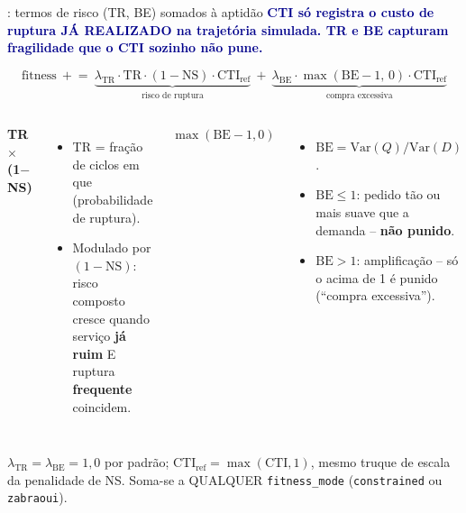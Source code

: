 \begin{frame}{\novo: termos de risco (TR, BE) somados à aptidão}
  \footnotesize
  \textbf{\textcolor{darkblue}{CTI só registra o custo de ruptura JÁ REALIZADO na trajetória simulada. TR e BE capturam fragilidade que o CTI sozinho não pune.}}
  \vspace{0.4em}

  \[
    \mathrm{fitness}\ \mathrel{+}=\ \underbrace{\lambda_{\mathrm{TR}}\cdot \mathrm{TR}\cdot(1-\mathrm{NS})\cdot \mathrm{CTI}_{\mathrm{ref}}}_{\text{risco de ruptura}}
    \ +\ \underbrace{\lambda_{\mathrm{BE}}\cdot \max(\mathrm{BE}-1,\,0)\cdot \mathrm{CTI}_{\mathrm{ref}}}_{\text{compra excessiva}}
  \]

  \begin{columns}[T,onlytextwidth]
      \textbf{TR $\times$ (1$-$NS)}
      \begin{itemize}
        \item TR = fração de ciclos em que  (probabilidade de ruptura).
        \item Modulado por $(1{-}\mathrm{NS})$: risco composto cresce
          quando serviço \textbf{já ruim} E ruptura \textbf{frequente}
          coincidem.
      \end{itemize}
      \textbf{$\max(\mathrm{BE}-1,0)$}
      \begin{itemize}
        \item $\mathrm{BE}=\mathrm{Var}(Q)/\mathrm{Var}(D)$.
        \item $\mathrm{BE}\leq1$: pedido tão ou mais suave que a demanda
          -- \textbf{não punido}.
        \item $\mathrm{BE}>1$: amplificação -- só o 
          acima de 1 é punido (``compra excessiva'').
      \end{itemize}
  \end{columns}
  \vspace{0.6em}
  \small $\lambda_{\mathrm{TR}}=\lambda_{\mathrm{BE}}=1{,}0$ por padrão;
  $\mathrm{CTI}_{\mathrm{ref}}=\max(\mathrm{CTI},1)$, mesmo truque de escala
  da penalidade de NS. Soma-se a QUALQUER \texttt{fitness\_mode}
  (\texttt{constrained} ou \texttt{zabraoui}).


\end{frame}
